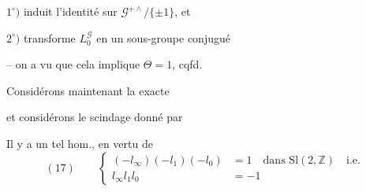$1^\circ)$ induit l'identité sur $\mathcal{G}^{+\wedge}/\{\pm1\}$, et

$2^\circ)$ transforme $L_{0}^{\mathcal{G}}$ en un sous-groupe conjugué

-- on a vu que cela implique $\Theta=1$, cqfd.

Considérons maintenant la 
exacte




et considérons le scindage donné par


Il  y a un tel hom., en vertu de
\[
(17)\qquad
\left\{\begin{aligned}
(-l_\infty)(-l_1)(-l_0)&=1\quad\text{dans }\mathrm{Sl}(2,\mathbb Z)\quad\text{i.e.}\\
l_\infty l_1l_0&=-1
\end{aligned}\right.
\]
\margin{$)$}

